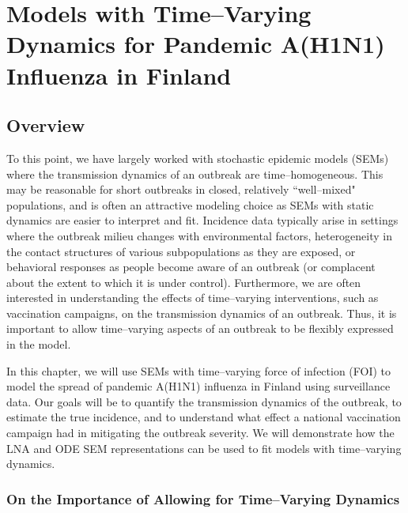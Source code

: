 \chapter{Models with Time--Varying Dynamics for Pandemic A(H1N1) Influenza in Finland}
\label{chap:lna_extensions}

\section{Overview}
\label{sec:lna_extensions_overview}
To this point, we have largely worked with stochastic epidemic models (SEMs) where the transmission dynamics of an outbreak are time--homogeneous. This may be reasonable for short outbreaks in closed, relatively ``well--mixed" populations, and is often an attractive modeling choice as SEMs with static dynamics are easier to interpret and fit. Incidence data typically arise in settings where the outbreak milieu changes with environmental factors, heterogeneity in the contact structures of various subpopulations as they are exposed, or behavioral responses as people become aware of an outbreak (or complacent about the extent to which it is under control). Furthermore, we are often interested in understanding the effects of time--varying interventions, such as vaccination campaigns, on the transmission dynamics of an outbreak. Thus, it is important to allow time--varying aspects of an outbreak to be flexibly expressed in the model.

In this chapter, we will use SEMs with time--varying force of infection (FOI) to model the spread of pandemic A(H1N1) influenza in Finland using surveillance data. Our goals will be to quantify the transmission dynamics of the outbreak, to estimate the true incidence, and to understand what effect a national vaccination campaign had in mitigating the outbreak severity. We will demonstrate how the LNA and ODE SEM representations can be used to fit models with time--varying dynamics. 


\subsection{On the Importance of Allowing for Time--Varying Dynamics}
\label{subsec:tparam_motivation}

